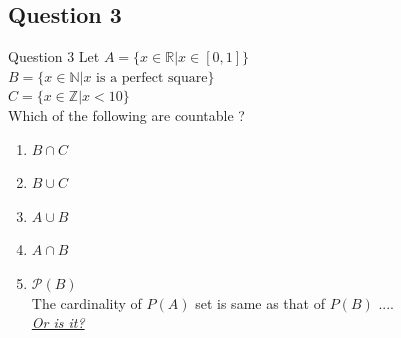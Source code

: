 \documentclass[xcolor=svgnames]{beamer}
\begin{document}
\subsection{Question 3}

\begin{frame}{Question 3}
Let $A = \{x \in \mathbb{R}| x \in [0,1] \}$
\\ $B = \{x \in \mathbb{N} | x \text{ is a perfect square}\}$
\\ $C = \{x \in \mathbb{Z} | x < 10\}$
\\ Which of the following are countable ?
\begin{enumerate}
    \item $B \cap C$
    \item $B \cup C$
    \item $A \cup B$
    \item $A \cap B$
    \item $\mathcal{P}(B)$
    \\ [*]  The cardinality of $P(A)$ set is same as that of $P(B)$ ....
        \\ \footnotesize{\textit{\href{https://www.youtube.com/watch?time\_continue=856&v=SrU9YDoXE88&feature=emb\_logo}{Or is it?}}}
        
\end{enumerate}
\end{frame}


\end{document}
